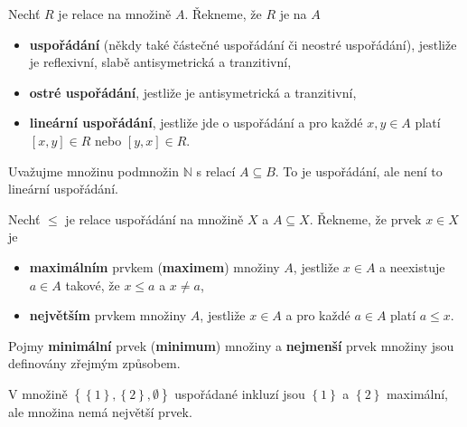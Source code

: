 \begin{definice}
Nechť $R$ je relace na množině $A$. Řekneme, že $R$ je na $A$
\begin{itemize}
\item \textbf{uspořádání} (někdy také částečné uspořádání či neostré uspořádání),
jestliže je reflexivní, slabě antisymetrická a tranzitivní,
\item \textbf{ostré uspořádání}, jestliže je antisymetrická a tranzitivní,
\item \textbf{lineární uspořádání}, jestliže jde o uspořádání a pro každé $x,y\in A$ platí
$[x,y]\in R$ nebo $[y,x]\in R$.
\end{itemize}
\end{definice}

\begin{priklad}
	Uvažujme množinu podmnožin $\mathbb N $ s relací $A\subseteq B$. To je uspořádání, ale není to lineární uspořádání.
\end{priklad}

\begin{definice}
Nechť $\le$ je relace uspořádání na množině $X$ a $A\subseteq X$. Řekneme, že prvek
$x\in X$ je
\begin{itemize}
\item \textbf{maximálním} prvkem (\textbf{maximem}) množiny $A$, jestliže $x\in A$ a neexistuje
$a\in A$ takové, že $x\le a$ a $x\ne a$,
\item \textbf{největším} prvkem množiny $A$, jestliže $x\in A$ a pro každé $a\in A$ platí
$a\le x$.
\end{itemize}
\par Pojmy \textbf{minimální} prvek (\textbf{minimum}) množiny a \textbf{nejmenší} prvek množiny jsou definovány
zřejmým způsobem.
\end{definice}

\begin{priklad}
	V množině $\left \{ \left \{ 1 \right \}, \left \{ 2 \right \} ,\emptyset  \right \} $ uspořádané inkluzí jsou
	$\left \{ 1 \right \} $ a $\left \{ 2 \right \} $ maximální, ale množina nemá největší prvek.
\end{priklad}


